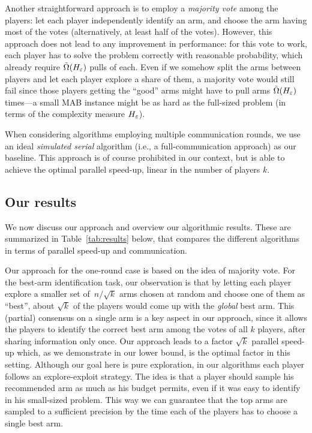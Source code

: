 \documentclass{article} %
\begin{document}
Another straightforward approach is to employ a \emph{majority vote} among the players: let each player independently identify an arm, and choose the arm having most of the votes (alternatively, at least half of the votes).
However, this approach does not lead to any improvement in performance: for this vote to work, each player has to solve the problem correctly with reasonable probability, which already require $\tilde{\Omega}(H_\varepsilon)$ pulls of each. 
Even if we somehow split the arms between players and let each player explore a share of them, a majority vote would still fail since those players getting the ``good'' arms might have to pull arms $\tilde{\Omega}(H_\varepsilon)$ times---a small MAB instance might be as hard as the full-sized problem (in terms of the complexity measure $H_\varepsilon$).

When considering algorithms employing multiple communication rounds, we use an ideal \emph{simulated serial} algorithm (i.e., a full-communication approach) as our baseline. 
This approach is of course prohibited in our context, but is able to achieve the optimal parallel speed-up, linear in the number of players $k$.



\subsection{Our results}

We now discuss our approach and overview our algorithmic results.  
These are summarized in Table~\ref{tab:results} below, that compares the different algorithms in terms of parallel speed-up and communication.

Our approach for the one-round case is based on the idea of majority vote. 
For the best-arm identification task, our observation is that by letting each player explore a smaller set of~$n/\sqrt{k}$ arms chosen at random and choose one of them as ``best'', about $\sqrt{k}$ of the players would come up with the \emph{global} best arm.
This (partial) consensus on a single arm is a key aspect in our approach, since it allows the players to  identify the correct best arm among the votes of all $k$ players, after sharing information only once.
Our approach leads to a factor $\sqrt{k}$ parallel speed-up which, as we demonstrate in our lower bound, is the optimal factor in this setting.
Although our goal here is pure exploration, in our algorithms each player follows an explore-exploit strategy. 
The idea is that a player should sample his recommended arm as much as his budget permits, even if it was easy to identify in his small-sized problem. %
This way we can guarantee that the top arms are sampled to a sufficient precision by the time each of the players has to choose a single best arm.
\end{document}
